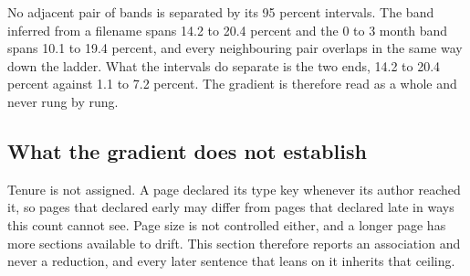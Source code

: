 No adjacent pair of bands is separated by its 95 percent intervals.
The band inferred from a filename spans 14.2 to 20.4 percent and the 0 to 3 month band spans 10.1 to 19.4 percent, and every neighbouring pair overlaps in the same way down the ladder.
What the intervals do separate is the two ends, 14.2 to 20.4 percent against 1.1 to 7.2 percent.
The gradient is therefore read as a whole and never rung by rung.

\subsection{What the gradient does not establish}

Tenure is not assigned.
A page declared its type key whenever its author reached it, so pages that declared early may differ from pages that declared late in ways this count cannot see.
Page size is not controlled either, and a longer page has more sections available to drift.
This section therefore reports an association and never a reduction, and every later sentence that leans on it inherits that ceiling.
